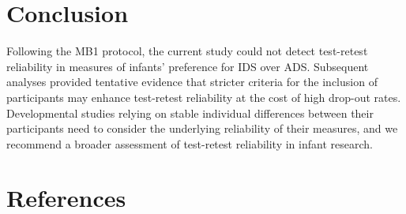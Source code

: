 \documentclass[
  man,floatsintext]{apa6}
\begin{document}
\hypertarget{conclusion}{%
\section{Conclusion}\label{conclusion}}

Following the MB1 protocol, the current study could not detect test-retest reliability in measures of infants' preference for IDS over ADS.
Subsequent analyses provided tentative evidence that stricter criteria for the inclusion of participants may enhance test-retest reliability at the cost of high drop-out rates.
Developmental studies relying on stable individual differences between their participants need to consider the underlying reliability of their measures, and we recommend a broader assessment of test-retest reliability in infant research.

\newpage

\hypertarget{references}{%
\section{References}\label{references}}

\begingroup
\setlength{\parindent}{-0.5in}
\setlength{\leftskip}{0.5in}
\end{document}
